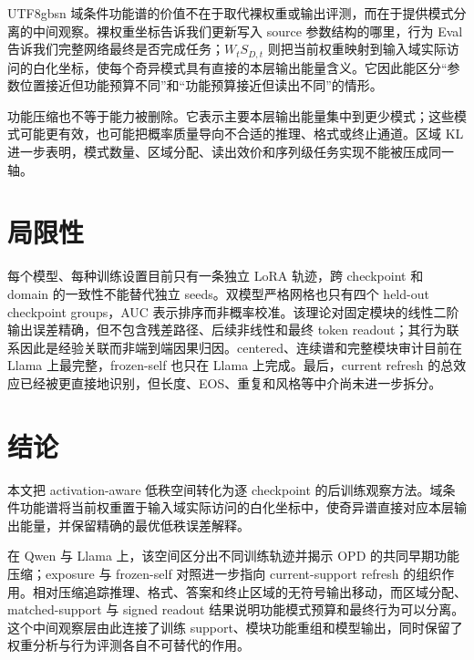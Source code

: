 \documentclass[letterpaper]{article} %
\begin{document}
\begin{CJK*}{UTF8}{gbsn}
域条件功能谱的价值不在于取代裸权重或输出评测，而在于提供模式分离的中间观察。裸权重坐标告诉我们更新写入 source 参数结构的哪里，行为 Eval 告诉我们完整网络最终是否完成任务；$W_tS_{D,t}$ 则把当前权重映射到输入域实际访问的白化坐标，使每个奇异模式具有直接的本层输出能量含义。它因此能区分“参数位置接近但功能预算不同”和“功能预算接近但读出不同”的情形。

功能压缩也不等于能力被删除。它表示主要本层输出能量集中到更少模式；这些模式可能更有效，也可能把概率质量导向不合适的推理、格式或终止通道。区域 KL 进一步表明，模式数量、区域分配、读出效价和序列级任务实现不能被压成同一轴。

\section{局限性}

每个模型、每种训练设置目前只有一条独立 LoRA 轨迹，跨 checkpoint 和 domain 的一致性不能替代独立 seeds。双模型严格网格也只有四个 held-out checkpoint groups，AUC 表示排序而非概率校准。该理论对固定模块的线性二阶输出误差精确，但不包含残差路径、后续非线性和最终 token readout；其行为联系因此是经验关联而非端到端因果归因。centered、连续谱和完整模块审计目前在 Llama 上最完整，frozen-self 也只在 Llama 上完成。最后，current refresh 的总效应已经被更直接地识别，但长度、EOS、重复和风格等中介尚未进一步拆分。

\section{结论}

本文把 activation-aware 低秩空间转化为逐 checkpoint 的后训练观察方法。域条件功能谱将当前权重置于输入域实际访问的白化坐标中，使奇异谱直接对应本层输出能量，并保留精确的最优低秩误差解释。

在 Qwen 与 Llama 上，该空间区分出不同训练轨迹并揭示 OPD 的共同早期功能压缩；exposure 与 frozen-self 对照进一步指向 current-support refresh 的组织作用。相对压缩追踪推理、格式、答案和终止区域的无符号输出移动，而区域分配、matched-support 与 signed readout 结果说明功能模式预算和最终行为可以分离。这个中间观察层由此连接了训练 support、模块功能重组和模型输出，同时保留了权重分析与行为评测各自不可替代的作用。



\end{CJK*}
\end{document}
